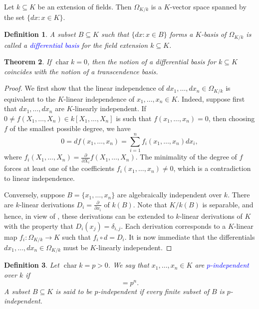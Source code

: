 \documentclass[10pt]{article}
\theoremstyle{thmstyle}
\newtheorem{theorem}{Theorem}[section]
\theoremstyle{defstyle}
\newtheorem{definition}[theorem]{Definition}
\newcommand{\chr}{\operatorname{char}}
\newcommand{\define}[1]{\textcolor{blue}{\textit{#1}}}
\begin{document}
Let $k\subseteq K$ be an extension of fields. Then $\Omega_{K/k}$ is a $K$-vector space spanned by the set $\{dx\colon x\in K\}$.

\begin{definition}
    A subset $B\subseteq K$ such that $\{dx\colon x\in B\}$ forms a $K$-basis of $\Omega_{K/k}$ is called a \define{differential basis} for the field extension $k\subseteq K$.
\end{definition}

\begin{theorem}
    If $\chr k = 0$, then the notion of a differential basis for $k\subseteq K$ coincides with the notion of a transcendence basis.
\end{theorem}
\begin{proof}
    We first show that the linear independence of $dx_1,\dots,dx_n\in\Omega_{K/k}$ is equivalent to the $K$-linear independence of $x_1,\dots,x_n\in K$. Indeed, suppose first that $dx_1,\dots,dx_n$ are $K$-linearly independent. If $0\ne f(X_1,\dots,X_n)\in k[X_1,\dots,X_n]$ is such that $f(x_1,\dots,x_n) = 0$, then choosing $f$ of the smallest possible degree, we have 
    \begin{equation*}
        0 = df(x_1,\dots,x_n) = \sum_{i = 1}^n f_i(x_1,\dots,x_n) dx_i,
    \end{equation*}
    where $f_i(X_1,\dots,X_n) = \frac{\partial}{\partial X_i}f(X_1,\dots,X_n)$. The minimality of the degree of $f$ forces at least one of the coefficients $f_i(x_1,\dots,x_n)\ne 0$, which is a contradiction to linear independence.

    Conversely, suppose $B = \{x_1,\dots,x_n\}$ are algebraically independent over $k$. There are $k$-linear derivations $D_i = \frac{\partial}{\partial x_i}$ of $k(B)$. Note that $K/k(B)$ is separable, and hence, in view of , these derivations can be extended to $k$-linear derivations of $K$ with the property that $D_i(x_j) = \delta_{i, j}$. Each derivation corresponds to a $K$-linear map $f_i\colon\Omega_{K/k}\to K$ such that $f_i\circ d = D_i$. It is now immediate that the differentials $dx_1,\dots,dx_n\in\Omega_{K/k}$ must be $K$-linearly independent.
\end{proof}

\begin{definition}
    Let $\chr k = p > 0$. We say that $x_1,\dots,x_n\in K$ are \define{$p$-independent} over $k$ if 
    \begin{equation*}
        [K^p(k, x_1,\dots,x_n) : K^p(k)] = p^n.
    \end{equation*}
    A subset $B\subseteq K$ is said to be $p$-independent if every finite subset of $B$ is $p$-independent.
\end{definition}
\end{document}
